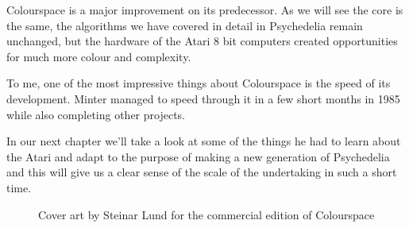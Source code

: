 Colourspace is a major improvement on its predecessor. As we will see the core is the
same, the algorithms we have covered in detail in Psychedelia remain unchanged, but the hardware of the
Atari 8 bit computers created opportunities for much more colour and complexity.

To me, one of the most impressive things about Colourspace is the speed of its development. Minter
managed to speed through it in a few short months in 1985 while also completing other projects.

In our next chapter we'll take a look at some of the things he had to learn about the Atari and adapt
to the purpose of making a new generation of Psychedelia and this will give us a clear sense of 
the scale of the undertaking in such a short time.


\clearpage
\begin{figure}[H]
    \centering
    \begin{adjustbox}{width=12cm,center}
    \end{adjustbox}
\caption{Cover art by Steinar Lund for the commercial edition of Colourspace}
\end{figure}
